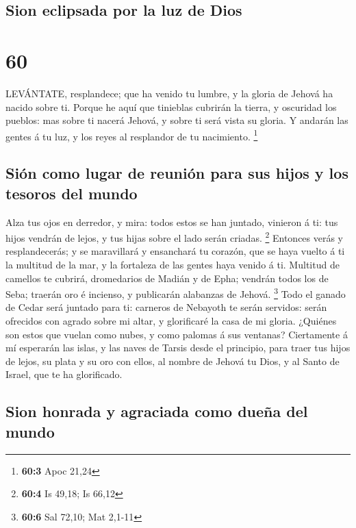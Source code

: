 \hypertarget{sion-eclipsada-por-la-luz-de-dios}{%
\subsection{Sion eclipsada por la luz de
Dios}\label{sion-eclipsada-por-la-luz-de-dios}}

\hypertarget{section-59}{%
\section{60}\label{section-59}}

 LEVÁNTATE, resplandece; que ha venido tu lumbre, y la
gloria de Jehová ha nacido sobre ti.  Porque he aquí que
tinieblas cubrirán la tierra, y oscuridad los pueblos: mas sobre ti
nacerá Jehová, y sobre ti será vista su gloria.  Y andarán
las gentes á tu luz, y los reyes al resplandor de tu nacimiento.
\footnote{\textbf{60:3} Apoc 21,24}

\hypertarget{siuxf3n-como-lugar-de-reuniuxf3n-para-sus-hijos-y-los-tesoros-del-mundo}{%
\subsection{Sión como lugar de reunión para sus hijos y los tesoros del
mundo}\label{siuxf3n-como-lugar-de-reuniuxf3n-para-sus-hijos-y-los-tesoros-del-mundo}}

 Alza tus ojos en derredor, y mira: todos estos se han
juntado, vinieron á ti: tus hijos vendrán de lejos, y tus hijas sobre el
lado serán criadas. \footnote{\textbf{60:4} Is 49,18; Is 66,12}
 Entonces verás y resplandecerás; y se maravillará y
ensanchará tu corazón, que se haya vuelto á ti la multitud de la mar, y
la fortaleza de las gentes haya venido á ti.  Multitud de
camellos te cubrirá, dromedarios de Madián y de Epha; vendrán todos los
de Seba; traerán oro é incienso, y publicarán alabanzas de Jehová.
\footnote{\textbf{60:6} Sal 72,10; Mat 2,1-11}  Todo el
ganado de Cedar será juntado para ti: carneros de Nebayoth te serán
servidos: serán ofrecidos con agrado sobre mi altar, y glorificaré la
casa de mi gloria.  ¿Quiénes son estos que vuelan como
nubes, y como palomas á sus ventanas?  Ciertamente á mí
esperarán las islas, y las naves de Tarsis desde el principio, para
traer tus hijos de lejos, su plata y su oro con ellos, al nombre de
Jehová tu Dios, y al Santo de Israel, que te ha glorificado.

\hypertarget{sion-honrada-y-agraciada-como-dueuxf1a-del-mundo}{%
\subsection{Sion honrada y agraciada como dueña del
mundo}\label{sion-honrada-y-agraciada-como-dueuxf1a-del-mundo}}

